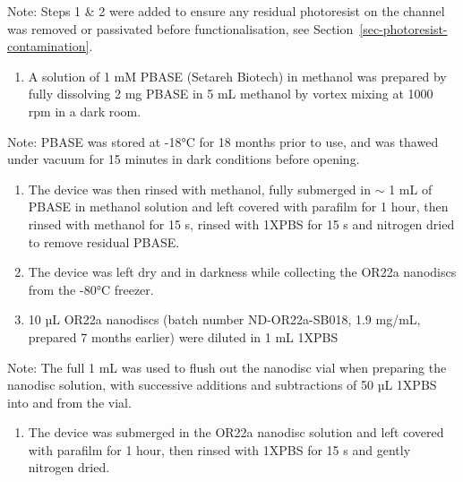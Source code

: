 \documentclass[
  a4paper,
]{scrbook}
\providecommand{\tightlist}{%
  \setlength{\itemsep}{0pt}\setlength{\parskip}{0pt}}\usepackage{longtable,booktabs,array}
\begin{document}
Note: Steps 1 \& 2 were added to ensure any residual photoresist on the
channel was removed or passivated before functionalisation, see
Section~\ref{sec-photoresist-contamination}.

\begin{enumerate}
\def\labelenumi{\arabic{enumi}.}
\setcounter{enumi}{2}
\tightlist
\item
  A solution of 1 mM PBASE (Setareh Biotech) in methanol was prepared by
  fully dissolving 2 mg PBASE in 5 mL methanol by vortex mixing at 1000
  rpm in a dark room.
\end{enumerate}

Note: PBASE was stored at -18°C for 18 months prior to use, and was
thawed under vacuum for 15 minutes in dark conditions before opening.

\begin{enumerate}
\def\labelenumi{\arabic{enumi}.}
\setcounter{enumi}{3}
\item
  The device was then rinsed with methanol, fully submerged in \(\sim\)
  1 mL of PBASE in methanol solution and left covered with parafilm for
  1 hour, then rinsed with methanol for 15 s, rinsed with 1XPBS for 15 s
  and nitrogen dried to remove residual PBASE.
\item
  The device was left dry and in darkness while collecting the OR22a
  nanodiscs from the -80°C freezer.
\item
  10 µL OR22a nanodiscs (batch number ND-OR22a-SB018, 1.9 mg/mL,
  prepared 7 months earlier) were diluted in 1 mL 1XPBS
\end{enumerate}

Note: The full 1 mL was used to flush out the nanodisc vial when
preparing the nanodisc solution, with successive additions and
subtractions of 50 µL 1XPBS into and from the vial.

\begin{enumerate}
\def\labelenumi{\arabic{enumi}.}
\setcounter{enumi}{6}
\tightlist
\item
  The device was submerged in the OR22a nanodisc solution and left
  covered with parafilm for 1 hour, then rinsed with 1XPBS for 15 s and
  gently nitrogen dried.
\end{enumerate}
\end{document}
